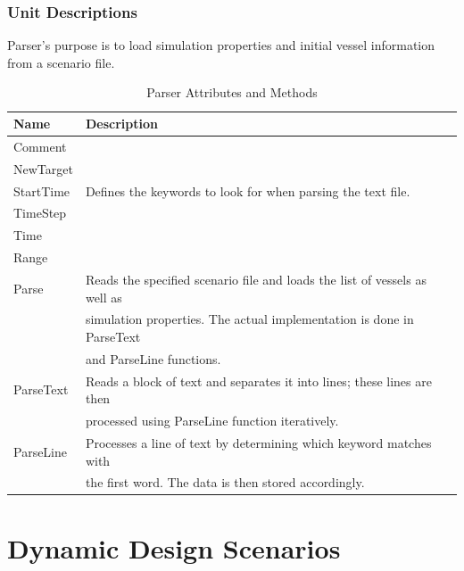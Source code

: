\documentclass[12pt]{article}
\begin{document}
\subsubsection{Unit Descriptions}
\vspace*{0.2in}
\vspace*{0.15in}
Parser’s purpose is to load simulation properties and initial vessel information from a scenario file.
\clearpage
\begin{table}[ht]
\centering
   \begin{tabular}{|l|l|}
        \hline
        {\large Name} & {\large Description} \\
        \hline\hline
        Comment &  \\
        NewTarget &  \\
        StartTime & Defines the keywords to look for when parsing the text file.\\
        TimeStep &  \\
        Time &  \\
        Range &  \\
        \hline
        Parse & Reads the specified scenario file and loads the list of vessels as well as\\
         & simulation properties. The actual implementation is done in ParseText\\
          & and ParseLine functions.\\
        \hline
        ParseText & Reads a block of text and separates it into lines; these lines are then\\
         & processed using ParseLine function iteratively.\\
        \hline
        ParseLine & Processes a line of text by determining which keyword matches with\\
         & the first word. The data is then stored accordingly.\\
        \hline
    \end{tabular}
\caption{Parser Attributes and Methods}
\end{table}




\clearpage


\section{Dynamic Design Scenarios}
\end{document}
